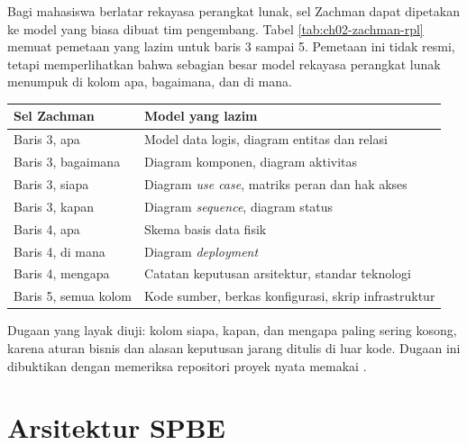 \begin{pendalaman}
Bagi mahasiswa berlatar rekayasa perangkat lunak, sel Zachman dapat
dipetakan ke model yang biasa dibuat tim pengembang. Tabel
\ref{tab:ch02-zachman-rpl} memuat pemetaan yang lazim untuk baris 3 sampai
5. Pemetaan ini tidak resmi, tetapi memperlihatkan bahwa sebagian besar
model rekayasa perangkat lunak menumpuk di kolom apa, bagaimana, dan di mana.

\begin{center}
  \label{tab:ch02-zachman-rpl}
  {\footnotesize
  \begin{tabularx}{\linewidth}{>{\raggedright\arraybackslash}p{3.0cm}
                               >{\raggedright\arraybackslash}X}
    \hline
    \textbf{Sel Zachman} & \textbf{Model yang lazim} \\
    \hline
    Baris 3, apa & Model data logis, diagram entitas dan relasi \\
    \hline
    Baris 3, bagaimana & Diagram komponen, diagram aktivitas \\
    \hline
    Baris 3, siapa & Diagram \textit{use case}, matriks peran dan hak akses \\
    \hline
    Baris 3, kapan & Diagram \textit{sequence}, diagram status \\
    \hline
    Baris 4, apa & Skema basis data fisik \\
    \hline
    Baris 4, di mana & Diagram \textit{deployment} \\
    \hline
    Baris 4, mengapa & Catatan keputusan arsitektur, standar teknologi \\
    \hline
    Baris 5, semua kolom & Kode sumber, berkas konfigurasi, skrip infrastruktur \\
    \hline
  \end{tabularx}}
\end{center}

Dugaan yang layak diuji: kolom siapa, kapan, dan mengapa paling sering
kosong, karena aturan bisnis dan alasan keputusan jarang ditulis di luar
kode. Dugaan ini dibuktikan dengan memeriksa repositori proyek nyata memakai
.
\end{pendalaman}

\section{Arsitektur SPBE}


